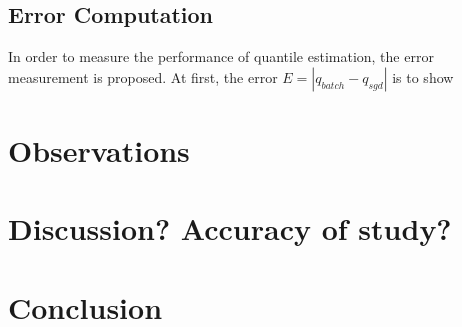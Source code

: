 \documentclass[12pt]{article}
\begin{document}
\subsection{Error Computation}

In order to measure the performance of quantile estimation, the error measurement is proposed. At first, the error $E = | q_{batch} - q_{sgd} |$ is to show 

\section{Observations}


\section{Discussion? Accuracy of study?}
\section{Conclusion}
\end{document}
